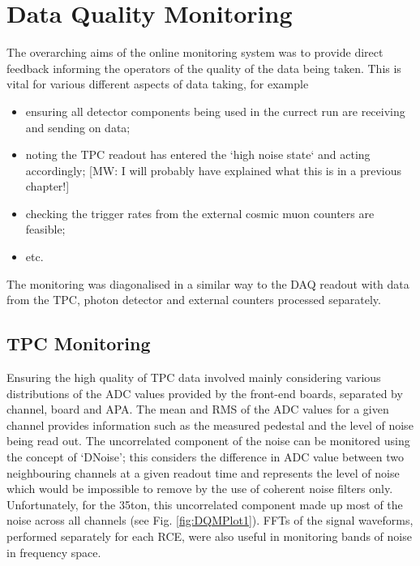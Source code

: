 \section{Data Quality Monitoring}\label{sec:DQM}

The overarching aims of the online monitoring system was to provide direct feedback informing the operators of the quality of the data being taken.  This is vital for various different aspects of data taking, for example
\begin{itemize}
\item ensuring all detector components being used in the currect run are receiving and sending on data;
\item noting the TPC readout has entered the `high noise state` and acting accordingly; [MW: I will probably have explained what this is in a previous chapter!]
\item checking the trigger rates from the external cosmic muon counters are feasible;
\item etc.
\end{itemize}

The monitoring was diagonalised in a similar way to the DAQ readout with data from the TPC, photon detector and external counters processed separately.

\subsection{TPC Monitoring}\label{sec:TPCMonitoring}

Ensuring the high quality of TPC data involved mainly considering various distributions of the ADC values provided by the front-end boards, separated by channel, board and APA.  The mean and RMS of the ADC values for a given channel provides information such as the measured pedestal and the level of noise being read out.  The uncorrelated component of the noise can be monitored using the concept of `DNoise'; this considers the difference in ADC value between two neighbouring channels at a given readout time and represents the level of noise which would be impossible to remove by the use of coherent noise filters only.  Unfortunately, for the 35ton, this uncorrelated component made up most of the noise across all channels (see Fig. \ref{fig:DQMPlot1}).  FFTs of the signal waveforms, performed separately for each RCE, were also useful in monitoring bands of noise in frequency space.

